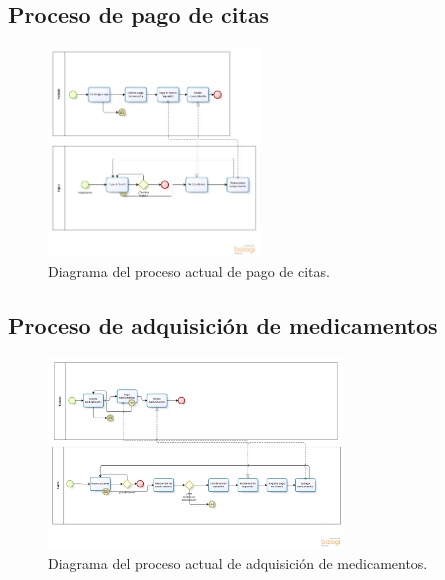     \subsection{Proceso de pago de citas}

\begin{figure}[htbp!]
		\centering
			\includegraphics[width=0.5\textwidth]{images/Proceso_actual_pago_citas}
		\caption{Diagrama del proceso actual de pago de citas.}
	\end{figure}

\subsection{Proceso de adquisición de medicamentos}

\begin{figure}[htbp!]
		\centering
			\includegraphics[width=0.7\textwidth]{images/Proceso_actual_medicamentos}
		\caption{Diagrama del proceso actual de adquisición de medicamentos.}
	\end{figure}
    \newpage
